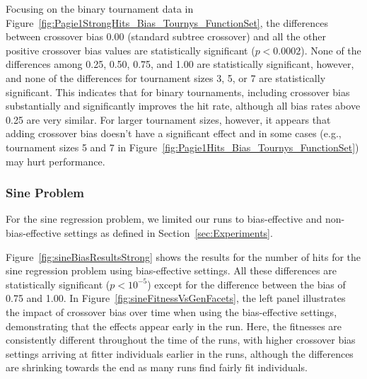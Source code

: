 \documentclass{sig-alternate}
\begin{document}
Focusing on the binary tournament data in Figure~\ref{fig:Pagie1StrongHits_Bias_Tournys_FunctionSet}, the differences
between crossover bias 0.00 (standard subtree crossover) and all the other positive crossover bias values are
statistically significant ($p<0.0002$). 
None of the differences among 0.25, 0.50, 0.75, and 1.00 are statistically significant, however, and
none of the differences for tournament sizes 3, 5, or 7 are statistically significant. This indicates that for binary
tournaments, including crossover bias substantially and significantly improves the hit rate, although all bias rates
above 0.25 are very similar. For larger tournament sizes, however, it appears that adding crossover bias doesn't have a significant effect and in some cases (e.g., tournament sizes 5 and 7 in Figure~\ref{fig:Pagie1Hits_Bias_Tournys_FunctionSet}) may hurt performance.

%
%
%
%

\pagebreak

\subsubsection{Sine Problem}
\label{sec:sineRegression}

For the sine regression problem, we limited our runs to bias-effective and non-bias-effective settings as defined in Section~\ref{sec:Experiments}.

Figure~\ref{fig:sineBiasResultsStrong} shows the results for the number of hits 
for the sine regression problem using bias-effective
settings. All these differences are statistically significant ($p < 10^{-5}$) except for the difference between the
bias of 0.75 and 1.00. In Figure~\ref{fig:sineFitnessVsGenFacets}, the left panel illustrates the impact of crossover
bias over time when using the bias-effective settings, demonstrating that the effects appear early in the run. Here,
the fitnesses are consistently different throughout the time of the runs, with higher crossover bias settings arriving
at fitter individuals earlier in the runs, although the differences are shrinking towards the end as many runs find
fairly fit individuals.
\end{document}
